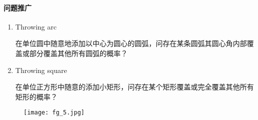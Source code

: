 		\paragraph{问题推广}
			\begin{enumerate}[\indent A:]
				\item
				Throwing arc
				\par 在单位圆中随意地添加以中心为圆心的圆弧，问存在某条圆弧其圆心角内部覆盖或部分覆盖其他所有圆弧的概率？
				\item Throwing square
				\par 在单位正方形中随意的添加小矩形，问存在某个矩形覆盖或完全覆盖其他所有矩形的概率？
			\end{enumerate}
			\begin{figure}[htbp]
			\centering
			\texttt{[image: fg\_5.jpg]}
			\end{figure}

